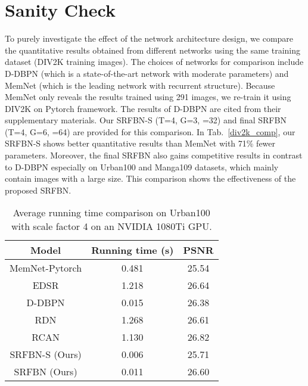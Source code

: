 \documentclass[10pt,twocolumn,letterpaper]{article}
\begin{document}
\section{Sanity Check}
To purely investigate the effect of the network architecture design, we compare the quantitative results obtained from different networks using the same training dataset (DIV2K training images\cite{Agustsson_2017_CVPR_Workshops}). The choices of networks for comparison include D-DBPN (which is a state-of-the-art network with moderate parameters) and MemNet\cite{tai2017memnet} (which is the leading network with recurrent structure). Because MemNet only reveals the results trained using 291 images, we re-train it using DIV2K on Pytorch framework. The results of D-DBPN are cited from their supplementary materials. Our SRFBN-S (T=4, G=3, =32) and final SRFBN (T=4, G=6, =64) are provided for this comparison. In Tab.~\ref{div2k_comp}, our SRFBN-S shows better quantitative results than MemNet with 71\% fewer parameters. Moreover, the final SRFBN also gains competitive results in contrast to D-DBPN especially on Urban100 and Manga109 datasets, which mainly contain images with a large size. This comparison shows the effectiveness of the proposed SRFBN.

\begin{table}[htbp]
	\centering
	\begin{tabular}{|c|c|c|}
		\hline
		Model          & Running time (s) & PSNR  \\ \hline \hline
		MemNet-Pytorch & 0.481            & 25.54 \\ \hline
		EDSR           & 1.218            & 26.64 \\ \hline
		D-DBPN         & 0.015            & 26.38 \\ \hline
		RDN            & 1.268            & 26.61 \\ \hline
		RCAN           & 1.130            & 26.82 \\ \hline
		SRFBN-S (Ours) & 0.006            & 25.71 \\ \hline
		SRFBN (Ours)   & 0.011            & 26.60 \\ \hline
	\end{tabular}
	\medskip
	\caption{Average running time comparison on Urban100 with scale factor 4 on an NVIDIA 1080Ti GPU.}
	\label{runtime}
\end{table}
\end{document}
